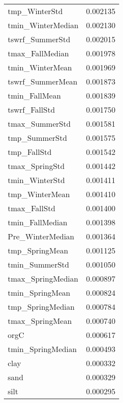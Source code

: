 \begin{tabular}{lr}
tmp_WinterStd & 0.002135 \\
tmin_WinterMedian & 0.002130 \\
tswrf_SummerStd & 0.002015 \\
tmax_FallMedian & 0.001978 \\
tmin_WinterMean & 0.001969 \\
tswrf_SummerMean & 0.001873 \\
tmin_FallMean & 0.001839 \\
tswrf_FallStd & 0.001750 \\
tmax_SummerStd & 0.001581 \\
tmp_SummerStd & 0.001575 \\
tmp_FallStd & 0.001542 \\
tmax_SpringStd & 0.001442 \\
tmin_WinterStd & 0.001411 \\
tmp_WinterMean & 0.001410 \\
tmax_FallStd & 0.001400 \\
tmin_FallMedian & 0.001398 \\
Pre_WinterMedian & 0.001364 \\
tmp_SpringMean & 0.001125 \\
tmin_SummerStd & 0.001050 \\
tmax_SpringMedian & 0.000897 \\
tmin_SpringMean & 0.000824 \\
tmp_SpringMedian & 0.000784 \\
tmax_SpringMean & 0.000740 \\
orgC & 0.000617 \\
tmin_SpringMedian & 0.000493 \\
clay & 0.000332 \\
sand & 0.000329 \\
silt & 0.000295 \\
\bottomrule
\end{tabular}
